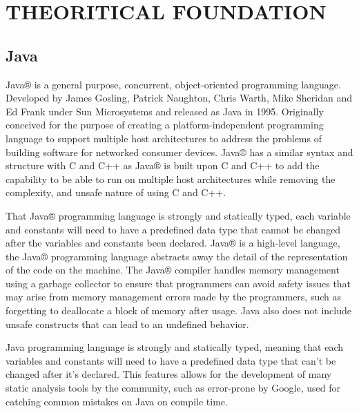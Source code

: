\chapter{THEORITICAL FOUNDATION}
\section{Java}
Java® is a general purpose, concurrent, object-oriented programming language. Developed by James Gosling, Patrick Naughton, Chris Warth, Mike Sheridan and Ed Frank under Sun Microsystems and released as Java in 1995. Originally conceived for the purpose of creating a platform-independent programming language to support multiple host architectures to address the problems of building software for networked consumer devices. Java® has a similar syntax and structure with C and C++ as Java® is built upon  C and C++ to add the capability to be able to run on multiple host architectures while removing the complexity, and unsafe nature of using C and C++.

That Java® programming language is strongly and statically typed, each variable and constants will need to have a predefined data type that cannot be changed after the variables and constants been declared. Java® is a high-level language, the Java® programming language abstracts away the detail of the representation of the code on the machine. The Java®  compiler handles memory management using a garbage collector to ensure that programmers can avoid safety issues that may arise from memory management errors made by the programmers, such as forgetting to deallocate a block of memory after usage. Java also does not include unsafe constructs that can lead to an undefined behavior. \cite{java}

Java programming language is strongly and statically typed, meaning that each variables and constants will need to have a predefined data type that can't be changed after it's declared. This features allows for the development of many static analysis tools by the community, such as error-prone by Google, used for catching common mistakes on Java on compile time. %


